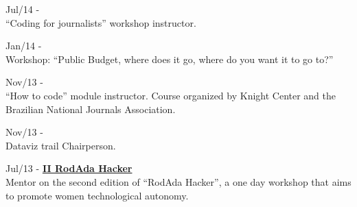 \documentclass[]{friggeri-cv}
\begin{document}
{\footnotesize{Jul/14}} - \href{http://abraji.org.br/congresso/}{\textbf{}}\\
           {``Coding for journalists'' workshop instructor}.

{\footnotesize{Jan/14}} - \href{http://www.techtudo.com.br/noticias/noticia/2014/01/cp2014-campus-party-brasil-2014-guia-traz-principais-atividades-por-perfil.html}{\textbf{}}\\
           {Workshop: ``Public Budget, where does it go, where do you want it to go to?''}

{\footnotesize{Nov/13}} - \href{https://knightcenter.utexas.edu/pt-br/blog/00-14390-inscricoes-abertas-para-primeiro-curso-da-anj-com-o-centro-knight-introducao-ao-jornal}{\textbf{}}\\
           {``How to code'' module instructor. Course organized by Knight Center and the Brazilian National Journals Association}.

{\footnotesize{Nov/13}} - \href{https://web.archive.org/web/20140330181037/http://2.encontro.dados.gov.br/encontro.html}{\textbf{}}\\
           {Dataviz trail Chairperson}.

{\footnotesize{Jul/13}} - \href{http://rodadahacker.com/}{\textbf{II RodAda Hacker}}\\
%
           {Mentor on the second edition of ``RodAda Hacker'', a one day workshop that aims to promote women technological autonomy}.
\end{document}
